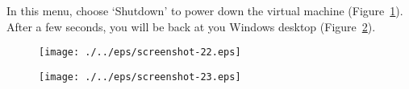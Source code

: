 In this menu, choose `Shutdown' to power down the virtual machine (Figure~\ref{fig:screenshot-22}). After a few seconds, you will be back at you Windows desktop (Figure~\ref{fig:screenshot-23}).

\begin{figure}[ht]
  \centering
    \texttt{[image: ./../eps/screenshot-22.eps]}
  \caption{}
  \label{fig:screenshot-22}
\end{figure}

\begin{figure}[hb]
  \centering
    \texttt{[image: ./../eps/screenshot-23.eps]}
  \caption{}
  \label{fig:screenshot-23}
\end{figure}



